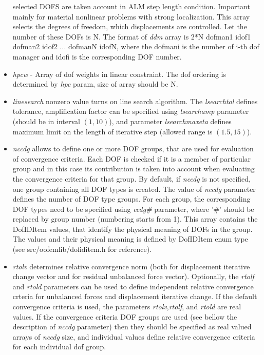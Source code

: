 \documentclass[a4paper]{article}
\newcommand{\param}[1]{{\em #1}}
\begin{document}
\begin{itemize}
selected DOFS are taken account in ALM step length
condition. Important mainly for material nonlinear problems with
strong localization. This array selects the degrees of freedom,
which displacements are controlled. Let the number of these DOFs is N.
The format of \param{ddm} array is 2*N dofman1 idof1
dofman2 idof2 ... dofmanN idofN, where the dofmani is the number of i-th dof manager  and idofi is the
corresponding DOF number.
\item \param{hpcw} - Array of dof weights in linear constraint. The
dof ordering is determined by \param{hpc} param, size of array should
be N.
\item \param{linesearch} nonzero value turns on line search
  algorithm. The \param{lsearchtol} defines tolerance, amplification
  factor can be specified using \param{lsearchamp} parameter (should
  be in interval $(1,10)$), and parameter \param{lsearchmaxeta}
  defines maximum limit on the length of iterative step (allowed range
  is $(1.5,15)$).
\item \param{nccdg} allows to define one or more DOF groups, that are used for evaluation of convergence criteria. Each DOF is checked if it is a member of particular group and in this case its contribution is taken into account when evaluating the convergence criteria for that group. By default, if \param{nccdg} is not specified, one group containing all DOF types is created. The value of \param{nccdg} parameter defines the number of DOF type groups. For each group, the corresponding DOF types need to be specified using \param{ccdg\#} parameter, where '\#' should be replaced by group number (numbering starts from 1). This array contains the DofIDItem values, that identify the physical meaning of DOFs in the group. The values and their physical meaning is defined by DofIDItem enum type (see src/oofemlib/dofiditem.h for reference).
\item \param{rtolv} determines relative convergence norm (both for displacement
iterative change vector and for residual unbalanced force vector). Optionally, the \param{rtolf} and \param{rtold} parameters can be used to define
independent relative convergence crteria for unbalanced forces and displacement
iterative change. If the default convergence criteria is used,
the parameters \param{rtolv},\param{rtolf}, and \param{rtold} are real values. If the convergence criteria DOF groups are used (see bellow the description of \param{nccdg} parameter) then they should be specified as real valued arrays of \param{nccdg} size, and individual values define relative convergence criteria for each individual dof group.
\end{itemize}
\end{document}
